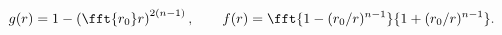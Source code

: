 \begin{equation}
g(r)=1-\left(\fft{r_0}r\right)^{2(n-1)},\qquad
f(r)=\fft{1-(r_0/r)^{n-1}}{1+(r_0/r)^{n-1}}.
\label{eq:genfg}
\end{equation}

